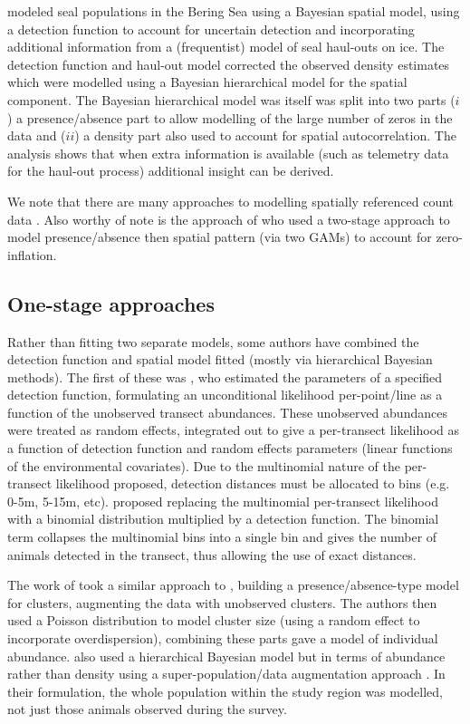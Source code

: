 \documentclass[a4paper,12pt]{article}
\begin{document}
\cite{VerHoef:2013ky} modeled seal populations in the Bering Sea using a Bayesian spatial model, using a detection function to account for uncertain detection and incorporating additional information from a (frequentist) model of seal haul-outs on ice. The detection function and haul-out model corrected the observed density estimates which were modelled using a Bayesian hierarchical model for the spatial component. The Bayesian hierarchical model was itself was split into two parts ($i$) a presence/absence part to allow modelling of the large number of zeros in the data and ($ii$) a density part also used to account for spatial autocorrelation. The analysis shows that when extra information is available (such as telemetry data for the haul-out process) additional insight can be derived.

We note that there are many approaches to modelling spatially referenced count data \citep[][provides an overview of such methods for marine bird modelling]{Oppel:2011tv}. Also worthy of note is the approach of \cite{Barry:2002bm} who used a two-stage approach to model presence/absence then spatial pattern (via two GAMs) to account for zero-inflation.

\subsection*{One-stage approaches}

Rather than fitting two separate models, some authors have combined the detection function and spatial model fitted (mostly via hierarchical Bayesian methods). The first of these was \cite{Royle:2004tu}, who estimated the parameters of a specified detection function, formulating an unconditional likelihood per-point/line as a function of the unobserved transect abundances. These unobserved abundances were treated as random effects, integrated out to give a per-transect likelihood as a function of detection function and random effects parameters (linear functions of the environmental covariates). Due to the multinomial nature of the per-transect likelihood proposed, detection distances must be allocated to bins (e.g. 0-5m, 5-15m, etc). \cite{Chelgren:2011us} proposed replacing the multinomial per-transect likelihood with a binomial distribution multiplied by a detection function. The binomial term collapses the multinomial bins into a single bin and gives the number of animals detected in the transect, thus allowing the use of exact distances.

The work of \cite{Schmidt:2011ec} took a similar approach to \cite{Royle:2008wc}, building a presence/absence-type model for clusters, augmenting the data with unobserved clusters. The authors then used a Poisson distribution to model cluster size (using a random effect to incorporate overdispersion), combining these parts gave a model of individual abundance. \cite{Conn:2012bx} also used a hierarchical Bayesian model but in terms of abundance rather than density using a super-population/data augmentation approach \cite[as in][]{Link:2009wv}. In their formulation, the whole population within the study region was modelled, not just those animals observed during the survey.
\end{document}
